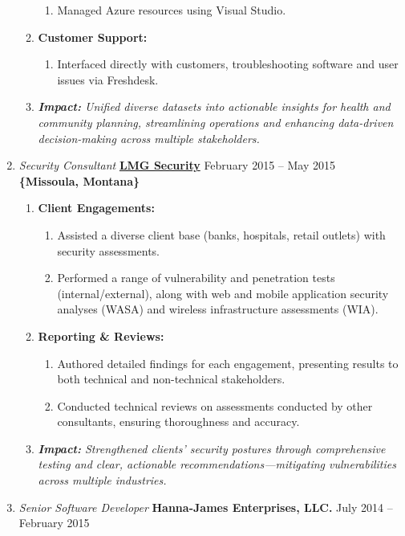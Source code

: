 \documentclass[oneside]{article}%
\begin{document}
\begin{enumerate}[]
\begin{enumerate}[]
\begin{enumerate}[-]
				\item Managed Azure resources using Visual Studio.
			\end{enumerate}
		\item \textbf{Customer Support:}
			\begin{enumerate}[-]
				\item Interfaced directly with customers, troubleshooting software and user issues via Freshdesk.
			\end{enumerate}
		\item \textit{\textbf{Impact:} Unified diverse datasets into actionable insights for health and community planning, streamlining operations and enhancing data-driven decision-making across multiple stakeholders.}
	\end{enumerate}
	\item \textit{Security Consultant} \textbf{\href{https://lmgsecurity.com/}{LMG Security}} \hfill February 2015 -- May 2015\\
	\textbf{\{Missoula, Montana\}}
	\begin{enumerate}[]
		\item \textbf{Client Engagements:}
			\begin{enumerate}[-]
				\item Assisted a diverse client base (banks, hospitals, retail outlets) with security assessments.
				\item Performed a range of vulnerability and penetration tests (internal/external), along with web and mobile application security analyses (WASA) and wireless infrastructure assessments (WIA).
			\end{enumerate}
		\item \textbf{Reporting \& Reviews:}
			\begin{enumerate}[-]
				\item Authored detailed findings for each engagement, presenting results to both technical and non-technical stakeholders.
				\item Conducted technical reviews on assessments conducted by other consultants, ensuring thoroughness and accuracy.
			\end{enumerate}
		\item \textit{\textbf{Impact:} Strengthened clients’ security postures through comprehensive testing and clear, actionable recommendations—mitigating vulnerabilities across multiple industries.}
	\end{enumerate}
	\item \textit{Senior Software Developer} \textbf{Hanna-James Enterprises, LLC.} \hfill July 2014 -- February 2015\\

\end{enumerate}
\end{document}
